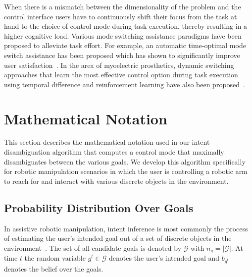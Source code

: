 \documentclass[conference]{IEEEtran}
\begin{document}
When there is a mismatch between the dimensionality of the problem and the control interface users have to continuously shift their focus from the task at hand to the choice of control mode during task execution, thereby resulting in a higher cognitive load. Various mode switching assistance paradigms have been proposed to alleviate task effort. For example, an automatic time-optimal mode switch assistance has been proposed which has shown to significantly improve user satisfaction~\citep{herlant2016assistive}. In the area of myoelectric prosthetics, dynamic switching approaches that learn the most effective control option during task execution using temporal difference and reinforcement learning have also been proposed~\cite{pilarski2012dynamic}. 


\section{Mathematical Notation}\label{sec:math}
This section describes the mathematical notation used in our intent disambiguation algorithm that computes a control mode that maximally disambiguates between the various goals.
We develop this algorithm specifically for robotic manipulation scenarios in which the user is controlling a robotic arm to reach for and interact with various discrete objects in the environment.

\subsection{Probability Distribution Over Goals}\label{ssec:notation}
 In assistive robotic manipulation, intent inference is most commonly the process of estimating the user's intended goal out of a set of discrete objects in the environment~\citep{calli2015ycb}. The set of all candidate goals is denoted by $\mathcal{G}$ with $n_g = \vert\mathcal{G}\vert$.
At time $t$ the random variable $g^t \in \mathcal{G}$ denotes the user's intended goal and $b_{g^t}$ denotes the belief over the goals. 
\end{document}
